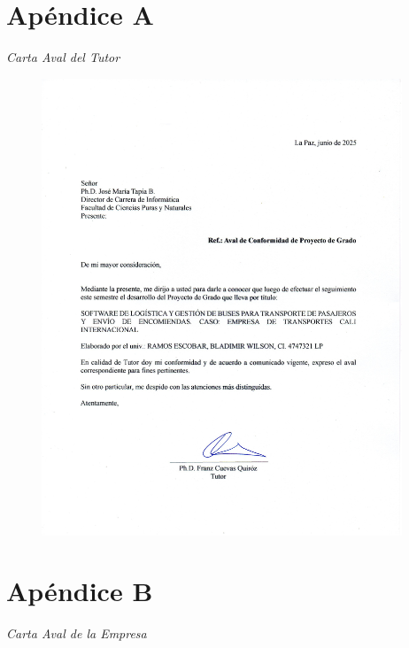 \appendix

\chapter{Apéndice A}
\textit{Carta Aval del Tutor}

\begin{figure}[H]
	\centering
	\includegraphics[width=0.96\textwidth]{imagenes/carta_aval_tutor.jpg}
\end{figure}

\chapter{Apéndice B}
\textit{Carta Aval de la Empresa}

